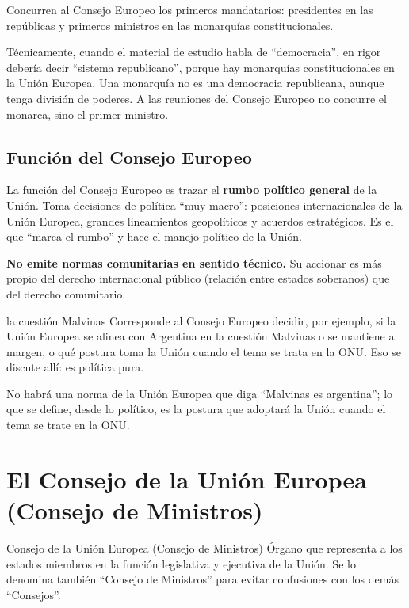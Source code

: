 \documentclass[12pt,oneside]{book}
\begin{document}
Concurren al Consejo Europeo los primeros mandatarios: presidentes en las repúblicas y primeros ministros en las monarquías constitucionales.

\begin{note}
Técnicamente, cuando el material de estudio habla de ``democracia'', en rigor debería decir ``sistema republicano'', porque hay monarquías constitucionales en la Unión Europea. Una monarquía no es una democracia republicana, aunque tenga división de poderes. A las reuniones del Consejo Europeo no concurre el monarca, sino el primer ministro.
\end{note}

\subsection{Función del Consejo Europeo}

La función del Consejo Europeo es trazar el \textbf{rumbo político general} de la Unión. Toma decisiones de política ``muy macro'': posiciones internacionales de la Unión Europea, grandes lineamientos geopolíticos y acuerdos estratégicos. Es el que ``marca el rumbo'' y hace el manejo político de la Unión.

\textbf{No emite normas comunitarias en sentido técnico.} Su accionar es más propio del derecho internacional público (relación entre estados soberanos) que del derecho comunitario.

\begin{example}{la cuestión Malvinas}
Corresponde al Consejo Europeo decidir, por ejemplo, si la Unión Europea se alinea con Argentina en la cuestión Malvinas o se mantiene al margen, o qué postura toma la Unión cuando el tema se trata en la ONU. Eso se discute allí: es política pura.

No habrá una norma de la Unión Europea que diga ``Malvinas es argentina''; lo que se define, desde lo político, es la postura que adoptará la Unión cuando el tema se trate en la ONU.
\end{example}

\section{El Consejo de la Unión Europea (Consejo de Ministros)}

\begin{definition}{Consejo de la Unión Europea (Consejo de Ministros)}
Órgano que representa a los estados miembros en la función legislativa y ejecutiva de la Unión. Se lo denomina también ``Consejo de Ministros'' para evitar confusiones con los demás ``Consejos''.
\end{definition}
\end{document}
